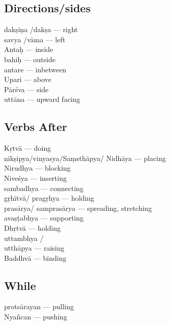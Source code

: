 \subsection*{Directions/sides}

\begin{multicols}{2}
dakṣiṇa /dakṣa --- right\\
savya /vāma --- left\\
Antaḥ --- inside\\
bahiḥ --- outside\\ 
antare --- inbetween \\
Upari --- above\\
Pārśva --- side\\
uttāna --- upward facing
\end{multicols}

\subsection*{Verbs After}

\begin{multicols}{2}
Kṛtvā --- doing \\
nikṣipya/vinyasya/Saṃsthāpya/ Nidhāya  --- placing \\
Nirudhya --- blocking\\
Niveśya --- inserting \\
sambadhya --- connecting \\
gṛhītvā/ pragṛhya --- holding\\
prasārya/ samprasārya --- spreading, stretching \\
avaṣṭabhya --- supporting \\
Dhṛtvā --- holding \\
uttambhya /\\
utthāpya --- raising \\
Baddhvā --- binding 
\end{multicols}
\vspace{-10pt}

\subsection*{While}
\vspace{-10pt}

\begin{multicols}{2}
protsārayan --- pulling \\
Nyañcan --- pushing
\end{multicols}
 \vspace{-10pt}
 
